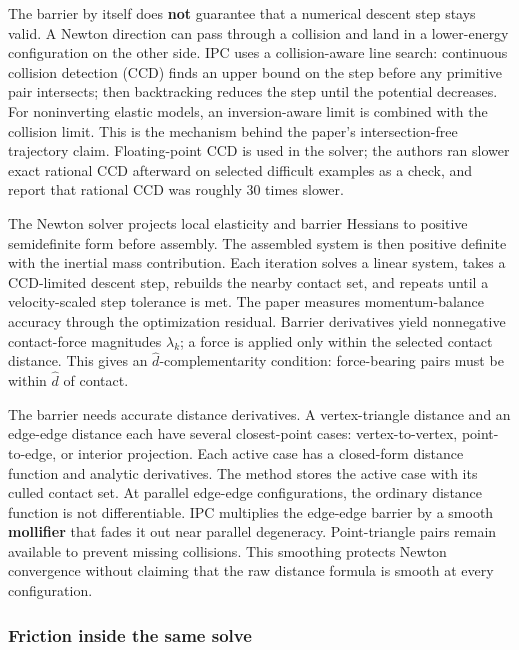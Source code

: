 The barrier by itself does \textbf{not} guarantee that a numerical descent step stays valid. A Newton direction can pass through a collision and land in a lower-energy configuration on the other side. IPC uses a collision-aware line search: continuous collision detection (CCD) finds an upper bound on the step before any primitive pair intersects; then backtracking reduces the step until the potential decreases. For noninverting elastic models, an inversion-aware limit is combined with the collision limit. This is the mechanism behind the paper's intersection-free trajectory claim. Floating-point CCD is used in the solver; the authors ran slower exact rational CCD afterward on selected difficult examples as a check, and report that rational CCD was roughly 30 times slower.

The Newton solver projects local elasticity and barrier Hessians to positive semidefinite form before assembly. The assembled system is then positive definite with the inertial mass contribution. Each iteration solves a linear system, takes a CCD-limited descent step, rebuilds the nearby contact set, and repeats until a velocity-scaled step tolerance is met. The paper measures momentum-balance accuracy through the optimization residual. Barrier derivatives yield nonnegative contact-force magnitudes \(\lambda_k\); a force is applied only within the selected contact distance. This gives an \(\widehat d\)-complementarity condition: force-bearing pairs must be within \(\widehat d\) of contact.

The barrier needs accurate distance derivatives. A vertex-triangle distance and an edge-edge distance each have several closest-point cases: vertex-to-vertex, point-to-edge, or interior projection. Each active case has a closed-form distance function and analytic derivatives. The method stores the active case with its culled contact set. At parallel edge-edge configurations, the ordinary distance function is not differentiable. IPC multiplies the edge-edge barrier by a smooth \textbf{mollifier} that fades it out near parallel degeneracy. Point-triangle pairs remain available to prevent missing collisions. This smoothing protects Newton convergence without claiming that the raw distance formula is smooth at every configuration.

\subsubsection{Friction inside the same solve}\label{04-visual-computing-ii-ch029-friction-inside-the-same-solve}

